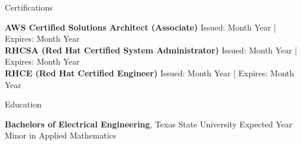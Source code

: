 \documentclass{resume} %
\begin{document}
\begin{rSection}{Certifications}

{\bf AWS Certified Solutions Architect (Associate)} \hfill {Issued: Month Year | Expires: Month Year} \\
{\bf RHCSA (Red Hat Certified System Administrator)} \hfill {Issued: Month Year | Expires: Month Year} \\
{\bf RHCE (Red Hat Certified Engineer)} \hfill {Issued: Month Year | Expires: Month Year} \\

\end{rSection}


\begin{rSection}{Education}

{\bf Bachelors of Electrical Engineering}, Texas State University \hfill {Expected Year} \\
Minor in Applied Mathematics


\end{rSection}
\end{document}
